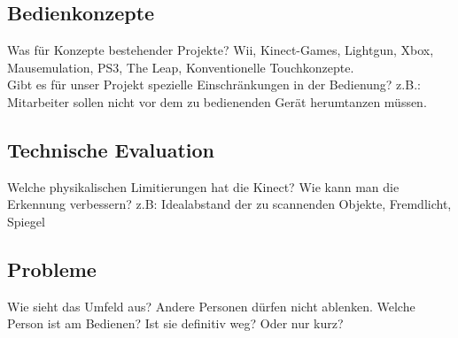 \documentclass[11pt]{article} %
\begin{document}
\subsection{Bedienkonzepte}
Was für Konzepte bestehender Projekte? Wii, Kinect-Games, Lightgun, Xbox, Mausemulation, PS3, The Leap, Konventionelle Touchkonzepte.\\
Gibt es für unser Projekt spezielle Einschränkungen in der Bedienung? z.B.: Mitarbeiter sollen nicht vor dem zu bedienenden Gerät herumtanzen müssen.

\subsection{Technische Evaluation}
Welche physikalischen Limitierungen hat die Kinect? Wie kann man die Erkennung verbessern? z.B: Idealabstand der zu scannenden Objekte, Fremdlicht, Spiegel

\subsection{Probleme}
Wie sieht das Umfeld aus? Andere Personen dürfen nicht ablenken. Welche Person ist am Bedienen? Ist sie definitiv weg? Oder nur kurz?
\end{document}
